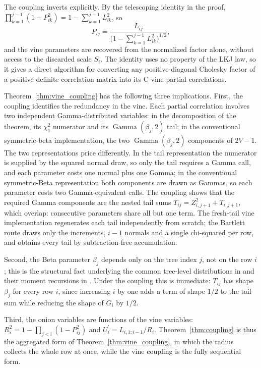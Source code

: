 \documentclass[12pt,english]{article}
\theoremstyle{plain} %
\theoremstyle{definition} %
\theoremstyle{remark} %
\begin{document}
The coupling inverts explicitly. By the telescoping identity in the proof, $\prod_{k=1}^{j-1}(1-P_{ik}^2)=1-\sum_{k=1}^{j-1}L_{ik}^2$, so
$$
P_{ij}=\frac{L_{ij}}{\bigl(1-\sum_{k=1}^{j-1}L_{ik}^2\bigr)^{1/2}},
$$
and the vine parameters are recovered from the normalized factor alone, without access to the discarded scale $S_i$. The identity uses no property of the LKJ law, so it gives a direct algorithm for converting any positive-diagonal Cholesky factor of a positive definite correlation matrix into its C-vine partial correlations.

Theorem~\ref{thm:vine_coupling} has the following three implications. First, the coupling identifies the redundancy in the vine. Each partial correlation involves two independent Gamma-distributed variables: in the decomposition of the theorem, its $\chi^2_1$ numerator and its $\operatorname{Gamma}(\beta_j,2)$ tail; in the conventional symmetric-beta implementation, the two $\operatorname{Gamma}(\beta_j,2)$ components of $2V-1$. The two representations price differently. In the tail representation the numerator is supplied by the squared normal draw, so only the tail requires a Gamma call, and each parameter costs one normal plus one Gamma; in the conventional symmetric-Beta representation both components are drawn as Gammas, so each parameter costs two Gamma-equivalent calls. The coupling shows that the required Gamma components are the nested tail sums $T_{ij}=Z_{i,j+1}^2+T_{i,j+1}$, which overlap: consecutive parameters share all but one term. The fresh-tail vine implementation regenerates each tail independently from scratch; the Bartlett route draws only the increments, $i-1$ normals and a single chi-squared per row, and obtains every tail by subtraction-free accumulation.

Second, the Beta parameter $\beta_j$ depends only on the tree index $j$, not on the row $i$; this is the structural fact underlying the common tree-level distributions in \citet{LewandowskiKurowickaJoe:2009} and their moment recursions in \citet{JoeKurowicka:2026}. Under the coupling this is immediate: $T_{ij}$ has shape $\beta_j$ for every row $i$, since increasing $i$ by one adds a term of shape $1/2$ to the tail sum while reducing the shape of $G_i$ by $1/2$.

Third, the onion variables are functions of the vine variables: $R_i^2=1-\prod_{j<i}(1-P_{ij}^2)$ and $U_i^\prime=L_{i,1:i-1}/R_i$. Theorem~\ref{thm:coupling} is thus the aggregated form of Theorem~\ref{thm:vine_coupling}, in which the radius collects the whole row at once, while the vine coupling is the fully sequential form.
\end{document}
